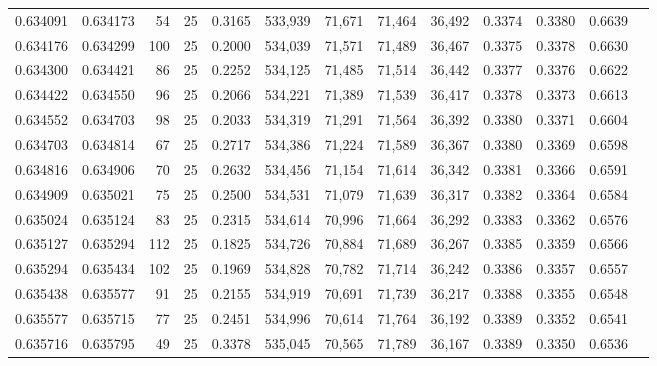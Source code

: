 \begin{tabular}{rrrrrrrrrrrrr}
0.634091 & 0.634173 &    54 &  25 &                                     0.3165 & 533,939 &  71,671 &  71,464 &  36,492 & 0.3374 & 0.3380 & 0.6639 \\
0.634176 & 0.634299 &   100 &  25 &                                     0.2000 & 534,039 &  71,571 &  71,489 &  36,467 & 0.3375 & 0.3378 & 0.6630 \\
0.634300 & 0.634421 &    86 &  25 &                                     0.2252 & 534,125 &  71,485 &  71,514 &  36,442 & 0.3377 & 0.3376 & 0.6622 \\
0.634422 & 0.634550 &    96 &  25 &                                     0.2066 & 534,221 &  71,389 &  71,539 &  36,417 & 0.3378 & 0.3373 & 0.6613 \\
0.634552 & 0.634703 &    98 &  25 &                                     0.2033 & 534,319 &  71,291 &  71,564 &  36,392 & 0.3380 & 0.3371 & 0.6604 \\
0.634703 & 0.634814 &    67 &  25 &                                     0.2717 & 534,386 &  71,224 &  71,589 &  36,367 & 0.3380 & 0.3369 & 0.6598 \\
0.634816 & 0.634906 &    70 &  25 &                                     0.2632 & 534,456 &  71,154 &  71,614 &  36,342 & 0.3381 & 0.3366 & 0.6591 \\
0.634909 & 0.635021 &    75 &  25 &                                     0.2500 & 534,531 &  71,079 &  71,639 &  36,317 & 0.3382 & 0.3364 & 0.6584 \\
0.635024 & 0.635124 &    83 &  25 &                                     0.2315 & 534,614 &  70,996 &  71,664 &  36,292 & 0.3383 & 0.3362 & 0.6576 \\
0.635127 & 0.635294 &   112 &  25 &                                     0.1825 & 534,726 &  70,884 &  71,689 &  36,267 & 0.3385 & 0.3359 & 0.6566 \\
0.635294 & 0.635434 &   102 &  25 &                                     0.1969 & 534,828 &  70,782 &  71,714 &  36,242 & 0.3386 & 0.3357 & 0.6557 \\
0.635438 & 0.635577 &    91 &  25 &                                     0.2155 & 534,919 &  70,691 &  71,739 &  36,217 & 0.3388 & 0.3355 & 0.6548 \\
0.635577 & 0.635715 &    77 &  25 &                                     0.2451 & 534,996 &  70,614 &  71,764 &  36,192 & 0.3389 & 0.3352 & 0.6541 \\
0.635716 & 0.635795 &    49 &  25 &                                     0.3378 & 535,045 &  70,565 &  71,789 &  36,167 & 0.3389 & 0.3350 & 0.6536 \\

\end{tabular}

